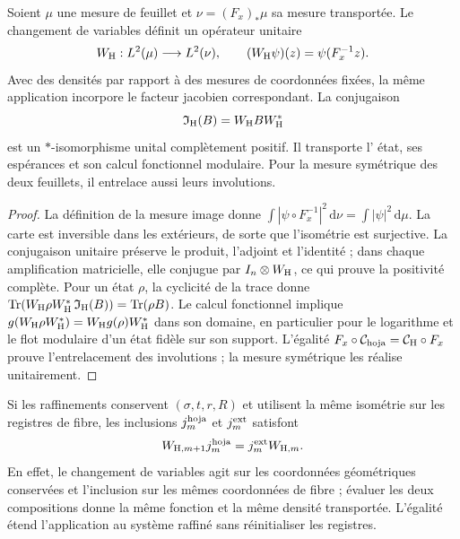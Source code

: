 \begin{proposition}
\label{x_reciprocidad:vii:prop:transporte-unitario-horizonte}
Soient \(\mu\) une mesure de feuillet et \(\nu=(F_x)_*\mu\) sa mesure
transportée. Le changement de variables définit un opérateur unitaire
\begin{equation}
 W_{\rm H}:L^2(\mu)\longrightarrow L^2(\nu),\qquad
 (W_{\rm H}\psi)(z)=\psi(F_x^{-1}z).
 \label{x_reciprocidad:vii:eq:unitaria-horizonte}
\end{equation}
Avec des densités par rapport à des mesures de coordonnées fixées, la même application incorpore le facteur jacobien correspondant. La conjugaison
\begin{equation}
 \mathfrak I_{\rm H}(B)=W_{\rm H}BW_{\rm H}^*
 \label{x_reciprocidad:vii:eq:mapa-observables-horizonte}
\end{equation}
est un \(*\)-isomorphisme unital complètement positif. Il transporte l'
état, ses espérances et son calcul fonctionnel modulaire. Pour la mesure
symétrique des deux feuillets, il entrelace aussi leurs involutions.
\end{proposition}
\begin{proof}
La définition de la mesure image donne \(\int|\psi\circ F_x^{-1}|^2\,\mathrm d\nu
=\int|\psi|^2\,\mathrm d\mu\). La carte est inversible dans les extérieurs, de sorte que l'isométrie est surjective. La conjugaison unitaire préserve le produit, l'adjoint et l'identité ; dans chaque amplification matricielle, elle conjugue par \(I_n\otimes W_{\rm H}\), ce qui prouve la positivité complète. Pour un état \(\rho\), la cyclicité de la trace donne \(\operatorname{Tr}(W_{\rm H}\rho W_{\rm H}^*
\,\mathfrak I_{\rm H}(B))=\operatorname{Tr}(\rho B)\). Le calcul fonctionnel implique \(g(W_{\rm H}\rho W_{\rm H}^*)=W_{\rm H}g(\rho)W_{\rm H}^*\) dans son domaine, en particulier pour le logarithme et le flot modulaire d'un état fidèle sur son support. L'égalité \(F_x\circ\mathcal C_{\rm hoja}=\mathcal C_{\rm H}\circ F_x\) prouve l'entrelacement des involutions ; la mesure symétrique les réalise unitairement.
\end{proof}

Si les raffinements conservent \((\sigma,t,r,R)\) et utilisent la même
isométrie sur les registres de fibre, les inclusions
\(j_m^{\rm hoja}\) et \(j_m^{\rm ext}\) satisfont
\begin{equation}
 W_{{\rm H},m+1}j_m^{\rm hoja}
 =j_m^{\rm ext}W_{{\rm H},m}.
 \label{x_reciprocidad:vii:eq:naturalidad-horizonte}
\end{equation}
En effet, le changement de variables agit sur les coordonnées géométriques
conservées et l'inclusion sur les mêmes coordonnées de fibre ; évaluer
les deux compositions donne la même fonction et la même densité transportée.
L'égalité étend l'application au système raffiné sans réinitialiser les registres.

